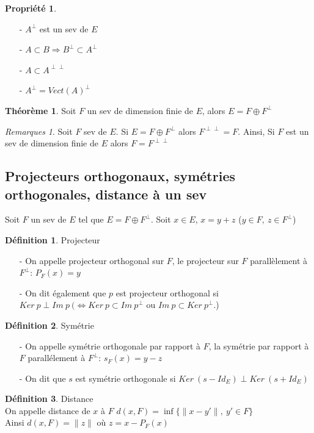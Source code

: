 \documentclass[fleqn]{article}
\theoremstyle{definition} \newtheorem*{defi}{D\'efinition}
\theoremstyle{definition} \newtheorem*{theo}{Th\'eor\`eme}
\theoremstyle{definition} \newtheorem*{coro}{Corollaire}
\theoremstyle{remark} \newtheorem*{rqs}{Remarques}
\theoremstyle{definition} \newtheorem*{prop}{Propri\'et\'e}
\begin{document}
\begin{prop} $ $
	\begin{enumerate}
		\item [-] $A^{\perp}$ est un sev de $E$
		\item [-] $A \subset B \Rightarrow B^\perp \subset A^\perp$
		\item [-] $A \subset A^{\perp \perp}$
		\item [-] $A^\perp = Vect(A)^\perp$
	\end{enumerate}
\end{prop}

\begin{theo} Soit $F$ un sev de dimension finie de $E$, alors $E = F \oplus F^\perp$
	\begin{rqs}
		Soit $F$ sev de $E$. Si $E = F \oplus F^\perp$ alors $F^{\perp \perp} = F$. Ainsi, Si $F$ est un sev de dimension finie de $E$ alors
		$F = F^{\perp \perp}$
	\end{rqs}
\end{theo}

\subsection{Projecteurs orthogonaux, sym\'etries orthogonales, distance \`a un sev}

Soit $F$ un sev de $E$ tel que $E = F \oplus F^\perp$. Soit $x \in E$, $x = y + z$ ($y \in F ,\ z \in F^\perp$)
\begin{defi} Projecteur
	\begin{itemize}
		\item [-] On appelle projecteur orthogonal sur $F$, le projecteur sur $F$ parall\`element \`a $F^{\perp}$:  $P_F(x) = y$
		\item [-] On dit \'egalement que $p$ est projecteur orthogonal si $Ker\ p \perp Im\  p\ (\Leftrightarrow Ker\ p
			\subset Im\ p^\perp$ ou $ Im\ p \subset Ker\ p^\perp$.)
	\end{itemize}
\end{defi}
\begin{defi} Sym\'etrie
	\begin{enumerate}
		\item [-] On appelle sym\'etrie orthogonale par rapport \`a $F$, la sym\'etrie par rapport \`a $F$ parall\'element \`a $F^\perp$: $s_F(x)
			= y - z$
		\item [-] On dit que $s$ est sym\'etrie orthogonale si $Ker\ (s-Id_E) \perp Ker\ (s + Id_E)$
	\end{enumerate}
\end{defi}
\begin{defi} Distance \\
	On appelle distance de $x$ \`a $F$ $d(x,F) = \inf \{ \|x-y'\| ,\ y' \in F\}$ \\
	Ainsi $d(x,F) = \|z\|$ o\`u $z = x - P_F(x)$
\end{defi}
\end{document}
